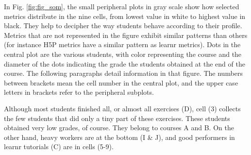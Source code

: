 \documentclass{aims}
\theoremstyle{definition}
\begin{document}
In Fig. \ref {fig:fig_som}, the small peripheral plots in gray scale
show how selected metrics distribute in the nine cells, from lowest
value in white to highest value in black. They help to decipher the way
students behave according to their profile. Metrics that are not
represented in the figure exhibit similar patterns than others (for
instance H5P metrics have a similar pattern as learnr metrics). Dots in
the central plot are the various students, with color representing the
course and the diameter of the dots indicating the grade the students
obtained at the end of the course. The following paragraphs detail
information in that figure. The numbers between brackets mean the cell
number in the central plot, and the upper case letters in brackets refer
to the peripheral subplots.

Although most students finished all, or almost all exercises (D), cell
(3) collects the few students that did only a tiny part of these
exercises. These students obtained very low grades, of course. They
belong to courses A and B. On the other hand, heavy workers are at the
bottom (I \& J), and good performers in learnr tutorials (C) are in
cells (5-9).
\end{document}
